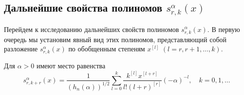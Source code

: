 \subsection{Дальнейшие свойства полиномов $s_{r,k}^{\alpha}(x)$ }


Перейдем к исследованию дальнейших свойств полиномов $s_{r,k}^{\alpha}(x)$. В первую очередь мы установим явный вид этих полиномов, представляющий собой разложение $s_{r,k}^{\alpha}(x)$ по обобщенным степеням $x^{[l]}$ $(l=r,r+1,\ldots,k)$.
\begin{theorem}\label{charlier-Shar_thm3}
	Для $\alpha>0$ имеют место равенства
	$$ 	s_{r,k+r}^{\alpha}(x) = \frac{1}{(h_n(\alpha))^{1/2}} \sum_{l=0}^{k} \frac{k^{[l]}x^{[l+r]}}{l!(l+r)^{[r]}} (-\alpha)^{-l}, \quad k=0,1,\ldots	$$
\end{theorem}

